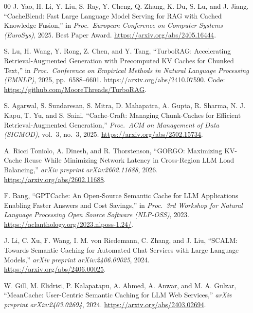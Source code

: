 \documentclass[conference]{IEEEtran}
\begin{document}
\begin{thebibliography}{00}
J. Yao, H. Li, Y. Liu, S. Ray, Y. Cheng, Q. Zhang, K. Du, S. Lu, and
J. Jiang, ``CacheBlend: Fast Large Language Model Serving for RAG
with Cached Knowledge Fusion,'' in \emph{Proc.\ European Conference
on Computer Systems (EuroSys)}, 2025. Best Paper Award.
\url{https://arxiv.org/abs/2405.16444}.

S. Lu, H. Wang, Y. Rong, Z. Chen, and Y. Tang, ``TurboRAG: Accelerating
Retrieval-Augmented Generation with Precomputed KV Caches for Chunked
Text,'' in \emph{Proc.\ Conference on Empirical Methods in Natural
Language Processing (EMNLP)}, 2025, pp.~6588--6601.
\url{https://arxiv.org/abs/2410.07590}.
Code: \url{https://github.com/MooreThreads/TurboRAG}.

S. Agarwal, S. Sundaresan, S. Mitra, D. Mahapatra, A. Gupta, R. Sharma,
N. J. Kapu, T. Yu, and S. Saini, ``Cache-Craft: Managing Chunk-Caches
for Efficient Retrieval-Augmented Generation,'' \emph{Proc.\ ACM on
Management of Data (SIGMOD)}, vol.~3, no.~3, 2025.
\url{https://arxiv.org/abs/2502.15734}.

A. Ricci Toniolo, A. Dinesh, and R. Thorstenson, ``GORGO: Maximizing
KV-Cache Reuse While Minimizing Network Latency in Cross-Region LLM
Load Balancing,'' \emph{arXiv preprint arXiv:2602.11688}, 2026.
\url{https://arxiv.org/abs/2602.11688}.

F. Bang, ``GPTCache: An Open-Source Semantic Cache for LLM
Applications Enabling Faster Answers and Cost Savings,'' in
\emph{Proc.\ 3rd Workshop for Natural Language Processing Open Source
Software (NLP-OSS)}, 2023.
\url{https://aclanthology.org/2023.nlposs-1.24/}.

J. Li, C. Xu, F. Wang, I. M. von Riedemann, C. Zhang, and J. Liu,
``SCALM: Towards Semantic Caching for Automated Chat Services with
Large Language Models,'' \emph{arXiv preprint arXiv:2406.00025}, 2024.
\url{https://arxiv.org/abs/2406.00025}.

W. Gill, M. Elidrisi, P. Kalapatapu, A. Ahmed, A. Anwar, and
M. A. Gulzar, ``MeanCache: User-Centric Semantic Caching for LLM Web
Services,'' \emph{arXiv preprint arXiv:2403.02694}, 2024.
\url{https://arxiv.org/abs/2403.02694}.

\end{thebibliography}
\end{document}
